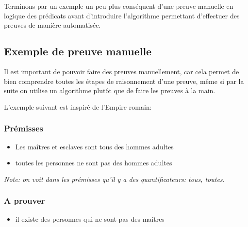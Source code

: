 Terminons par un exemple un peu plus conséquent d'une preuve manuelle en logique des prédicats avant d'introduire l'algorithme permettant d'effectuer des preuves de manière automatisée.
\subsection{Exemple de preuve manuelle}
Il est important de pouvoir faire des preuves manuellement, car cela permet de bien comprendre toutes les étapes de raisonnement d'une preuve, même si par la suite on utilise un algorithme plutôt que de faire les preuves à la main. 

L'exemple suivant est inspiré de l'Empire romain: 
\subsubsection{Prémisses}
\begin{itemize}
    \item Les maîtres et esclaves sont tous des hommes adultes
    \item toutes les personnes ne sont pas des hommes adultes
\end{itemize}
\textit{Note: on voit dans les prémisses qu'il y a des quantificateurs: tous, toutes. 
}
\subsubsection{A prouver} 
\begin{itemize}
    \item il existe des personnes qui ne sont pas des maîtres
\end{itemize}
